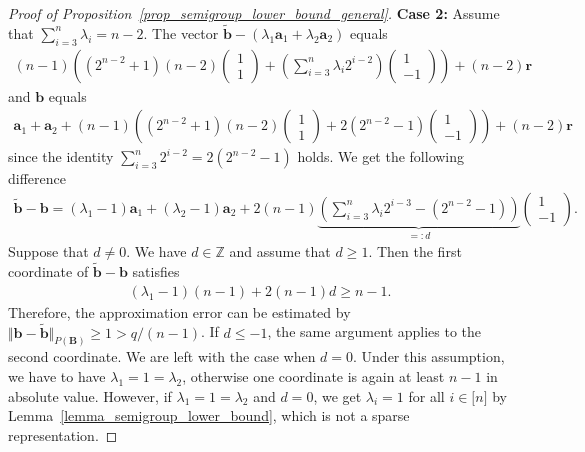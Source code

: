 \documentclass[10pt,a4paper]{amsart}
\newcommand{\Z}{\mathbb{Z}}
\newcommand{\bB}{\bm{B}}
\newcommand{\ba}{\bm{a}}
\newcommand{\bb}{\bm{b}}
\newcommand{\br}{\bm{r}}
\begin{document}
\begin{proof}[Proof of Proposition~\ref{prop_semigroup_lower_bound_general}]
		\textbf{Case 2:} Assume that $\sum_{i=3}^n\lambda_i = n-2$. 
		The vector $\tilde{\bb} - (\lambda_1\ba_1 + \lambda_2\ba_2)$ equals
		\begin{align*}
			(n-1)\left((2^{n-2} + 1) (n-2) \begin{pmatrix}
				1 \\ 1
			\end{pmatrix}
			+ \left(\sum_{i=3}^{n}\lambda_i2^{i-2}\right)\begin{pmatrix}
				1 \\ -1
			\end{pmatrix}\right) + (n-2)\br
		\end{align*}
		and $\bb$ equals
		\begin{align*}
			\ba_1 + \ba_2 + (n-1)\left((2^{n-2} + 1) (n-2)\begin{pmatrix}
				1 \\ 1
			\end{pmatrix} + 2\left(2^{n-2} - 1\right)\begin{pmatrix}
				1 \\ -1
			\end{pmatrix}\right) + (n-2)\br
		\end{align*}
		since the identity $\sum_{i=3}^n2^{i-2} = 2(2^{n-2} - 1)$ holds.
		We get the following difference
		\begin{align*}
			\tilde{\bb} - \bb = (\lambda_1 - 1)\ba_1 + (\lambda_2 - 1)\ba_2 + 2 (n-1)\underbrace{\left(\sum_{i=3}^{n}\lambda_i2^{i-3} - (2^{n-2} - 1)\right)}_{=:d}\begin{pmatrix}
				1 \\ -1
			\end{pmatrix}.
		\end{align*}
		Suppose that $d\neq 0$. We have $d\in\Z$ and assume that $d\geq 1$. Then the first coordinate of $\tilde{\bb}-\bb$ satisfies 
		\begin{align*}
			(\lambda_1 - 1)(n-1) + 2(n-1)d \geq n-1.
		\end{align*}
		Therefore, the approximation error can be estimated by $\Vert \bb - \tilde{\bb}\Vert_{P(\bB)}\geq 1 > q/(n-1)$. If $d\leq -1$, the same argument applies to the second coordinate. 
		We are left with the case when $d = 0$. Under this assumption, we have to have $\lambda_1 = 1 = \lambda_2$, otherwise one coordinate is again at least $n-1$ in absolute value. However, if $\lambda_1 = 1 = \lambda_2$ and $d=0$, we get $\lambda_i = 1$ for all $i\in\lbrack n\rbrack$ by Lemma~\ref{lemma_semigroup_lower_bound}, which is not a sparse representation.
		

\end{proof}
\end{document}
